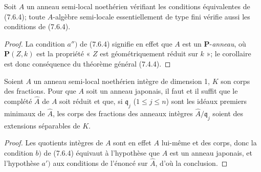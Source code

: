 \begin{corollary}[7.6.5]
\label{IV.2.s7.6.5-fr}
Soit $A$ un anneau semi-local noethérien vérifiant les conditions équivalentes
de \textup{(7.6.4)}; toute $A$-algèbre semi-locale essentiellement de type fini vérifie
aussi les conditions de \textup{(7.6.4)}.
\end{corollary}

\begin{proof}
La condition $a'')$ de (7.6.4) signifie en effet que $A$ est un
$\boldsymbol P$-\emph{anneau}, où $\boldsymbol P(Z,k)$ est la propriété « $Z$ est
géométriquement réduit sur $k$ »; le corollaire est donc conséquence du
théorème général (7.4.4).
\end{proof}

\begin{corollary}[7.6.6]
\label{IV.2.s7.6.6-fr}
Soient $A$ un anneau semi-local noethérien intègre de dimension 1, $K$ son
corps des fractions. Pour que $A$ soit un anneau japonais, il faut et il suffit
que le complété $\widehat A$
de $A$ soit réduit et que, si $\mathfrak q_j$ \textup{(}$1\leq j\leq n$\textup{)} sont les
idéaux premiers minimaux de $\widehat A$, les corps des fractions des anneaux
intègres $\widehat A/\mathfrak q_j$ soient des extensions séparables de $K$.
\end{corollary}

\begin{proof}
Les quotients intègres de $A$ sont en effet $A$ lui-même et des corps, donc la
condition $b)$ de (7.6.4) équivaut à l'hypothèse que $A$ est un anneau
japonais, et l'hypothèse $a')$ aux conditions de l'énoncé sur $\widehat A$,
d'où la conclusion.
\end{proof}

